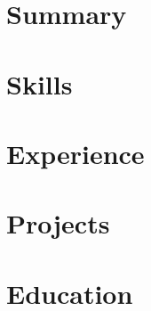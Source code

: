 \documentclass[letter,11pt]{article}
\begin{document}
\section{Summary}

\vspace{-0.3em}

\section{Skills}

\vspace{-0.4em}

\section{Experience}

\vspace{-0.3em}

\section{Projects}

\vspace{-0.3em}

\section{Education}

\end{document}

